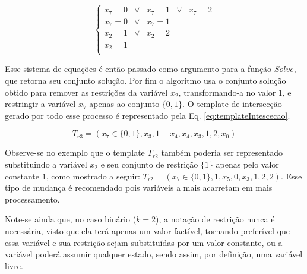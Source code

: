 \begin{equation}
\left\{\begin{matrix}
x_7	  = 0 	& \vee &	x_7	=	1 & \vee &	x_7	= 2	\\ 
x_7   = 0 	& \vee &	x_7	=	1					\\ 
x_2   = 1 	& \vee &	x_2	=	2					\\ 
x_2	  =	1											\\ 
\end{matrix}\right.
\label{eq:interseccaoRestrita}
\end{equation}

Esse sistema de equações é então passado como argumento para a função $Solve$, que retorna seu conjunto solução. Por fim o algoritmo usa o conjunto solução obtido para remover as restrições da variável $x_2$, transformando-a no valor $1$, e restringir a variável $x_7$ apenas ao conjunto $\{0,1\}$. O template de intersecção gerado por todo esse processo é representado pela Eq. \eqref{eq:templateIntescecao}.

\begin{equation}
T_{r3} = (x_7 \in \{0,1\}, x_3, 1-x_4, x_4, x_3, 1, 2, x_0)
\label{eq:templateIntescecao}
\end{equation}

Observe-se no exemplo que o template $T_{r2}$ também poderia ser representado substituindo a variável $x_2$ e seu conjunto de restrição $\{1\}$ apenas pelo valor constante $1$, como mostrado a seguir: $T_{r2} = (x_7 \in \{0,1\}, 1, x_5, 0, x_3, 1, 2, 2)$. Esse tipo de mudança é recomendado pois variáveis a mais acarretam em mais processamento.

Note-se ainda que, no caso binário ($k = 2$), a notação de restrição nunca é necessária, visto que ela terá apenas um valor factível, tornando preferível que essa variável e sua restrição sejam substituídas por um valor constante, ou a variável poderá assumir qualquer estado, sendo assim, por definição, uma variável livre.